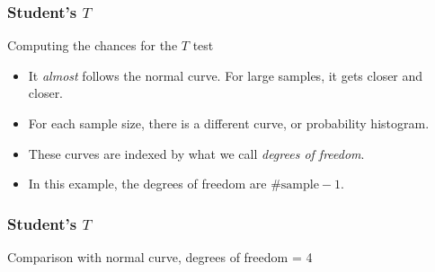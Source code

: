 \documentclass[handout]{beamer}
\begin{document}
   \begin{frame} \frametitle{Student's $T$}

   \begin{block}
   {Computing the chances for the $T$ test}
   \begin{itemize}

   \item It {\em almost} follows the normal curve. For large
     samples, it gets closer and closer.

   \item For each sample size, there is a different curve, or
   probability histogram.

   \item These curves are indexed by what we call {\em degrees of freedom}.

   \item In this example, the degrees of freedom are $\# \text{sample}-1$.
   \end{itemize}
   \end{block}
   \end{frame}



   \begin{frame}
   \frametitle{Student's $T$}
   \begin{center}
   \end{center}
   Comparison with normal curve, degrees of freedom = 4
   \end{frame}
\end{document}
